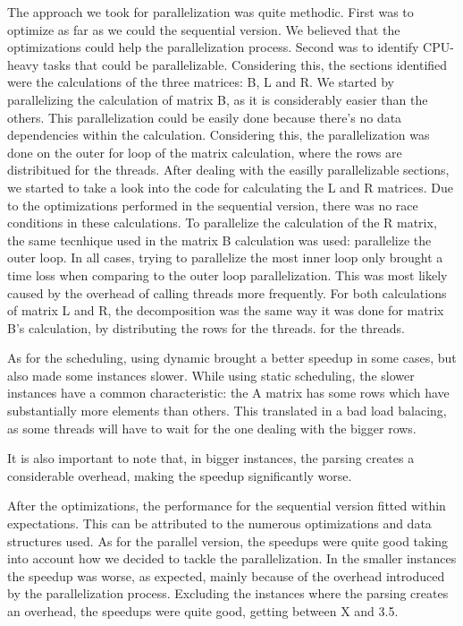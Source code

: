 \documentclass[a4paper]{article}
\begin{document}
The approach we took for parallelization was quite methodic. First was to optimize as 
far as we could the sequential version. We believed that the optimizations could help the
parallelization process. Second was to identify CPU-heavy tasks that could be  
parallelizable. Considering this, the sections identified were the calculations of the three 
matrices: B, L and R.  We started by parallelizing the calculation of matrix B, as it is
considerably easier than the others. This parallelization could be easily done because
there's no data dependencies within the calculation. Considering this, the parallelization
was done on the outer for loop of the matrix calculation, where the rows are distribitued 
for the threads. After dealing with the easilly parallelizable sections, we started to take a look
into the code for calculating the L and R matrices. Due to the optimizations performed in
the sequential version, there was no race conditions in these calculations. %
To parallelize the calculation of the R matrix, the same tecnhique used in the matrix B 
calculation was used: parallelize the outer loop. In all cases, trying to parallelize
the most inner loop only brought a time loss when comparing to the outer loop parallelization.
This was most likely caused by the overhead of calling threads more frequently. 
For both calculations of matrix L and R, the decomposition was the same way it was done
for matrix B's calculation, by distributing the rows for the threads.
for the threads.


As for the scheduling, using dynamic brought a better speedup in some cases, but also made
some instances slower. While using static scheduling, the slower instances have a common 
characteristic: the A matrix has some rows which have substantially more elements than others. 
This translated in a bad load balacing, as some threads will have to wait for the one dealing
with the bigger rows. 



It is also important to note that, in bigger instances, the parsing creates a considerable 
overhead, making the speedup significantly worse.

After the optimizations, the performance for the sequential version fitted within 
expectations. This can be attributed to the numerous optimizations and data structures used.
As for the parallel version, the speedups were quite good taking into account how we decided 
to tackle the parallelization. In the smaller instances the speedup was worse, as expected,
mainly because of the overhead introduced by the parallelization process. Excluding the 
instances where the parsing creates an overhead, the speedups were quite good, getting between X %
and 3.5.


\end{document}
